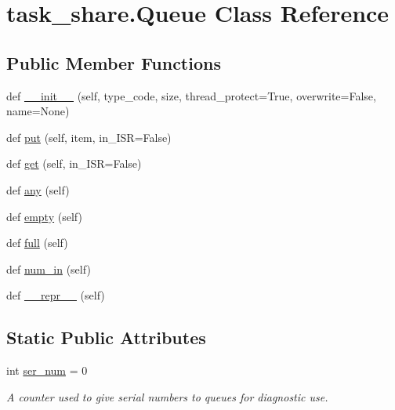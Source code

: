 \hypertarget{classtask__share_1_1Queue}{}\section{task\+\_\+share.\+Queue Class Reference}
\label{classtask__share_1_1Queue}
\subsection*{Public Member Functions}
\begin{DoxyCompactItemize}
\item 
def \mbox{\hyperlink{classtask__share_1_1Queue_a91ce05bf47c2634013fdb2689c2b207f}{\+\_\+\+\_\+init\+\_\+\+\_\+}} (self, type\+\_\+code, size, thread\+\_\+protect=True, overwrite=False, name=None)
\item 
def \mbox{\hyperlink{classtask__share_1_1Queue_ae785bdf9d397d61729c22656471a81df}{put}} (self, item, in\+\_\+\+I\+SR=False)
\item 
def \mbox{\hyperlink{classtask__share_1_1Queue_af2aef1dd3eed21c4b6c2e601cb8497d4}{get}} (self, in\+\_\+\+I\+SR=False)
\item 
def \mbox{\hyperlink{classtask__share_1_1Queue_a7cb2d23978b90a232cf9cea4cc0ccb6b}{any}} (self)
\item 
def \mbox{\hyperlink{classtask__share_1_1Queue_af9ada059fc09a44adc9084901e2f7266}{empty}} (self)
\item 
def \mbox{\hyperlink{classtask__share_1_1Queue_a0482d70ce6405fd8d85628b5cf95d471}{full}} (self)
\item 
def \mbox{\hyperlink{classtask__share_1_1Queue_a713321bacac5d93ecf89c4be1c15fe30}{num\+\_\+in}} (self)
\item 
def \mbox{\hyperlink{classtask__share_1_1Queue_a94d0801557844c8f7dcb772ca768a1a4}{\+\_\+\+\_\+repr\+\_\+\+\_\+}} (self)
\end{DoxyCompactItemize}
\subsection*{Static Public Attributes}
\begin{DoxyCompactItemize}
\item 
int \mbox{\hyperlink{classtask__share_1_1Queue_a6f9d87b116eb16dba0867d3746af9f5f}{ser\+\_\+num}} = 0
\begin{DoxyCompactList}\small\item\em A counter used to give serial numbers to queues for diagnostic use. \end{DoxyCompactList}\end{DoxyCompactItemize}


